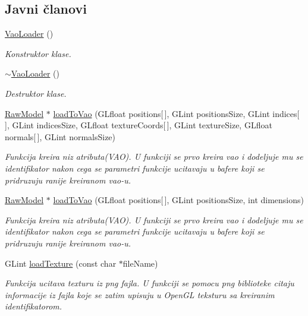 \subsection*{Javni članovi}
\begin{DoxyCompactItemize}
\item 
\hyperlink{classcore_1_1VaoLoader_ab025be7312c274b9737b19d308bd5845}{Vao\+Loader} ()
\begin{DoxyCompactList}\small\item\em Konstruktor klase. \end{DoxyCompactList}\item 
\hyperlink{classcore_1_1VaoLoader_a1b522bb4b83dbe751783fee04ac712d3}{$\sim$\+Vao\+Loader} ()
\begin{DoxyCompactList}\small\item\em Destruktor klase. \end{DoxyCompactList}\item 
\hyperlink{classmodel_1_1RawModel}{Raw\+Model} $\ast$ \hyperlink{classcore_1_1VaoLoader_a61e0aea1c2f59726a2ea8ba323d32b67}{load\+To\+Vao} (G\+Lfloat positions\mbox{[}$\,$\mbox{]}, G\+Lint positions\+Size, G\+Lint indices\mbox{[}$\,$\mbox{]}, G\+Lint indices\+Size, G\+Lfloat texture\+Coords\mbox{[}$\,$\mbox{]}, G\+Lint texture\+Size, G\+Lfloat normals\mbox{[}$\,$\mbox{]}, G\+Lint normals\+Size)
\begin{DoxyCompactList}\small\item\em Funkcija kreira niz atributa(\+V\+A\+O). U funkciji se prvo kreira vao i dodeljuje mu se identifikator nakon cega se parametri funkcije ucitavaju u bafere koji se pridruzuju ranije kreiranom vao-\/u. \end{DoxyCompactList}\item 
\hyperlink{classmodel_1_1RawModel}{Raw\+Model} $\ast$ \hyperlink{classcore_1_1VaoLoader_a44296bb7ab4ac3b909b050b54350f861}{load\+To\+Vao} (G\+Lfloat positions\mbox{[}$\,$\mbox{]}, G\+Lint positions\+Size, int dimensions)
\begin{DoxyCompactList}\small\item\em Funkcija kreira niz atributa(\+V\+A\+O). U funkciji se prvo kreira vao i dodeljuje mu se identifikator nakon cega se parametri funkcije ucitavaju u bafere koji se pridruzuju ranije kreiranom vao-\/u. \end{DoxyCompactList}\item 
G\+Lint \hyperlink{classcore_1_1VaoLoader_aeefd4de3346c1036d8d7249694fd404d}{load\+Texture} (const char $\ast$file\+Name)
\begin{DoxyCompactList}\small\item\em Funkcija ucitava texturu iz png fajla. U funkciji se pomocu png biblioteke citaju informacije iz fajla koje se zatim upisuju u Open\+GL teksturu sa kreiranim identifikatorom. \end{DoxyCompactList}\item 

\end{DoxyCompactItemize}
